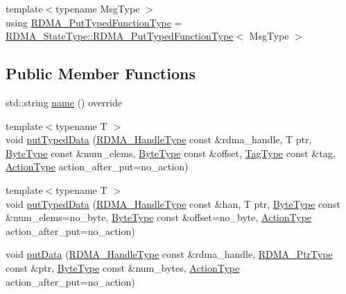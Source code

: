 \begin{DoxyCompactItemize}
\item 
{\footnotesize template$<$typename Msg\+Type $>$ }\\using \hyperlink{structvt_1_1rdma_1_1_r_d_m_a_manager_ad9746ec3367968e16945ef88c1ac45ce}{R\+D\+M\+A\+\_\+\+Put\+Typed\+Function\+Type} = \hyperlink{structvt_1_1rdma_1_1_state_a3f76d1ccdab20ed3091e36d8fb9ecda5}{R\+D\+M\+A\+\_\+\+State\+Type\+::\+R\+D\+M\+A\+\_\+\+Put\+Typed\+Function\+Type}$<$ Msg\+Type $>$
\end{DoxyCompactItemize}
\subsection*{Public Member Functions}
\begin{DoxyCompactItemize}
\item 
std\+::string \hyperlink{structvt_1_1rdma_1_1_r_d_m_a_manager_add0f236b62fd550b8eb3d78156a97403}{name} () override
\item 
{\footnotesize template$<$typename T $>$ }\\void \hyperlink{structvt_1_1rdma_1_1_r_d_m_a_manager_a30167dbd8b0165a273a9d91c84acded1}{put\+Typed\+Data} (\hyperlink{namespacevt_a10442579ec4e7ebef223818e64bcf908}{R\+D\+M\+A\+\_\+\+Handle\+Type} const \&rdma\+\_\+handle, T ptr, \hyperlink{namespacevt_aab8d55968084610ce3b17057981e9300}{Byte\+Type} const \&num\+\_\+elems, \hyperlink{namespacevt_aab8d55968084610ce3b17057981e9300}{Byte\+Type} const \&offset, \hyperlink{namespacevt_a84ab281dae04a52a4b243d6bf62d0e52}{Tag\+Type} const \&tag, \hyperlink{namespacevt_ae0a5a7b18cc99d7b732cb4d44f46b0f3}{Action\+Type} action\+\_\+after\+\_\+put=no\+\_\+action)
\item 
{\footnotesize template$<$typename T $>$ }\\void \hyperlink{structvt_1_1rdma_1_1_r_d_m_a_manager_a553764f2d91b42cf97991bbeadb75a5c}{put\+Typed\+Data} (\hyperlink{namespacevt_a10442579ec4e7ebef223818e64bcf908}{R\+D\+M\+A\+\_\+\+Handle\+Type} const \&han, T ptr, \hyperlink{namespacevt_aab8d55968084610ce3b17057981e9300}{Byte\+Type} const \&num\+\_\+elems=no\+\_\+byte, \hyperlink{namespacevt_aab8d55968084610ce3b17057981e9300}{Byte\+Type} const \&offset=no\+\_\+byte, \hyperlink{namespacevt_ae0a5a7b18cc99d7b732cb4d44f46b0f3}{Action\+Type} action\+\_\+after\+\_\+put=no\+\_\+action)
\item 
void \hyperlink{structvt_1_1rdma_1_1_r_d_m_a_manager_a651ca7aaa9fdbf404c41157b883407e2}{put\+Data} (\hyperlink{namespacevt_a10442579ec4e7ebef223818e64bcf908}{R\+D\+M\+A\+\_\+\+Handle\+Type} const \&rdma\+\_\+handle, \hyperlink{namespacevt_a9e2c953286c7616f7c218e9951790776}{R\+D\+M\+A\+\_\+\+Ptr\+Type} const \&ptr, \hyperlink{namespacevt_aab8d55968084610ce3b17057981e9300}{Byte\+Type} const \&num\+\_\+bytes, \hyperlink{namespacevt_ae0a5a7b18cc99d7b732cb4d44f46b0f3}{Action\+Type} action\+\_\+after\+\_\+put=no\+\_\+action)

\end{DoxyCompactItemize}
